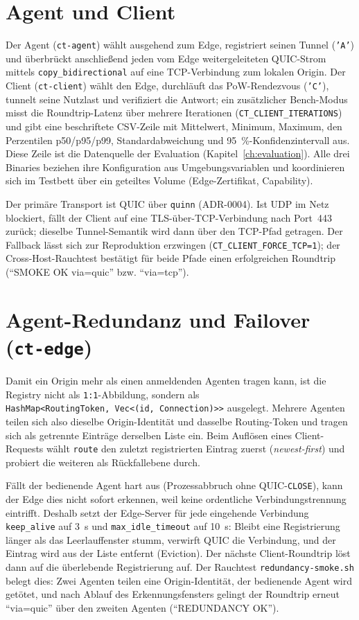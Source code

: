\section{Agent und Client}
\label{sec:impl-agentclient}

Der Agent (\texttt{ct-agent}) wählt ausgehend zum Edge, registriert seinen
Tunnel (\texttt{'A'}) und überbrückt anschließend jeden vom Edge
weitergeleiteten QUIC-Strom mittels \texttt{copy\_bidirectional} auf eine
TCP-Verbindung zum lokalen Origin. Der Client (\texttt{ct-client}) wählt den
Edge, durchläuft das PoW-Rendezvous (\texttt{'C'}), tunnelt seine Nutzlast und
verifiziert die Antwort; ein zusätzlicher Bench-Modus misst die
Roundtrip-Latenz über mehrere Iterationen (\texttt{CT\_CLIENT\_ITERATIONS}) und
gibt eine beschriftete CSV-Zeile mit Mittelwert, Minimum, Maximum, den
Perzentilen p50/p95/p99, Standardabweichung und 95~\%-Konfidenzintervall aus.
Diese Zeile ist die Datenquelle der Evaluation (Kapitel~\ref{ch:evaluation}).
Alle drei Binaries beziehen ihre Konfiguration aus Umgebungsvariablen und
koordinieren sich im Testbett über ein geteiltes Volume (Edge-Zertifikat,
Capability).

Der primäre Transport ist QUIC über \texttt{quinn} (ADR-0004). Ist UDP im Netz
blockiert, fällt der Client auf eine TLS-über-TCP-Verbindung nach Port~443
zurück; dieselbe Tunnel-Semantik wird dann über den TCP-Pfad getragen. Der
Fallback lässt sich zur Reproduktion erzwingen
(\texttt{CT\_CLIENT\_FORCE\_TCP=1}); der Cross-Host-Rauchtest bestätigt für
beide Pfade einen erfolgreichen Roundtrip (\enquote{SMOKE OK via=quic} bzw.
\enquote{via=tcp}).

\section{Agent-Redundanz und Failover (\texttt{ct-edge})}
\label{sec:impl-redundanz}

Damit ein Origin mehr als einen anmeldenden Agenten tragen kann, ist die
Registry nicht als \texttt{1:1}-Abbildung, sondern als
\texttt{HashMap<RoutingToken,\ Vec<(id,\ Connection)>>} ausgelegt. Mehrere
Agenten teilen sich also dieselbe Origin-Identität und dasselbe Routing-Token
und tragen sich als getrennte Einträge derselben Liste ein. Beim Auflösen eines
Client-Requests wählt \texttt{route} den zuletzt registrierten Eintrag zuerst
(\emph{newest-first}) und probiert die weiteren als Rückfallebene durch.

Fällt der bedienende Agent hart aus (Prozessabbruch ohne QUIC-\texttt{CLOSE}),
kann der Edge dies nicht sofort erkennen, weil keine ordentliche
Verbindungstrennung eintrifft. Deshalb setzt der Edge-Server für jede
eingehende Verbindung \texttt{keep\_alive} auf 3~s und
\texttt{max\_idle\_timeout} auf 10~s: Bleibt eine Registrierung länger als das
Leerlauffenster stumm, verwirft QUIC die Verbindung, und der Eintrag wird aus
der Liste entfernt (Eviction). Der nächste Client-Roundtrip löst dann auf die
überlebende Registrierung auf. Der Rauchtest \texttt{redundancy-smoke.sh}
belegt dies: Zwei Agenten teilen eine Origin-Identität, der bedienende Agent
wird getötet, und nach Ablauf des Erkennungsfensters gelingt der Roundtrip
erneut \enquote{via=quic} über den zweiten Agenten (\enquote{REDUNDANCY OK}).


